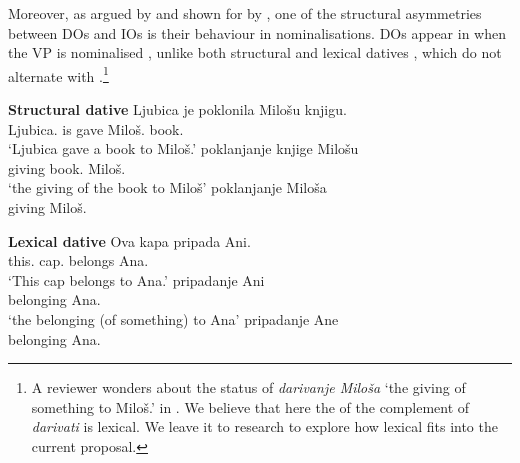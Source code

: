 \documentclass[output=paper,modfonts,newtxmath,hidelinks]{langscibook}
\begin{document}
\ea
{}\label{16:ex21a}
\label{16:ex21b}
\z \z

\largerpage[2]
\noindent Moreover, as argued by \citet{maling01} and shown for  by \citet{mcfadden04}, one of the structural asymmetries between DOs and IOs is their behaviour in nominalisations. DOs appear in  when the VP is nominalised , unlike both structural  and lexical datives , which do not alternate with .\footnote{A reviewer wonders about the status of \textit{darivanje Miloša} `the giving of something to Miloš.\genn' in . We believe that here the  of the complement of   \textit{darivati} is lexical. We leave it to  research to explore how lexical  fits into the current proposal.}

\ea \textbf{Structural dative}
\ea \gll Ljubica je poklonila Milošu knjigu.\\
Ljubica.\nomm{} is gave Miloš.\datt{} book.\accc\\
\glt `Ljubica gave a book to Miloš.'
\ex \gll poklanjanje knjige Milošu\\
giving book.\genn{} Miloš.\datt\\
\glt `the giving of the book to Miloš'\label{16:ex22b}
\ex\label{16:ex22c} \gll poklanjanje Miloša\\
giving Miloš.\genn\\
\z \z \z

\ea \textbf{Lexical dative}\label{16:ex23}
\ea\gll Ova kapa pripada Ani.\\
this.\nomm{} cap.\nomm{} belongs Ana.\datt\\
\glt `This cap belongs to Ana.'
\ex\gll pripadanje Ani\\
belonging Ana.\datt\\
\glt `the belonging (of something) to Ana'
\ex\gll pripadanje Ane\\
belonging Ana.\genn\\
\z \z \z
\newpage 
\end{document}
